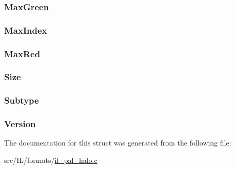 \hypertarget{struct_h_a_l_o_h_e_a_d_ad87d96087e9bc7638b73794455c70505}{
\subsubsection[{Max\-Green}]{ Max\-Green}}\label{struct_h_a_l_o_h_e_a_d_ad87d96087e9bc7638b73794455c70505}
\hypertarget{struct_h_a_l_o_h_e_a_d_a834ac3b22f70ee372f25adbbafdd832d}{
\subsubsection[{Max\-Index}]{ Max\-Index}}\label{struct_h_a_l_o_h_e_a_d_a834ac3b22f70ee372f25adbbafdd832d}
\hypertarget{struct_h_a_l_o_h_e_a_d_ab32f932f023853a698f9575d34670d58}{
\subsubsection[{Max\-Red}]{ Max\-Red}}\label{struct_h_a_l_o_h_e_a_d_ab32f932f023853a698f9575d34670d58}
\hypertarget{struct_h_a_l_o_h_e_a_d_acc434efe9df69cd2e13c646dfc6ff8a7}{
\subsubsection[{Size}]{ Size}}\label{struct_h_a_l_o_h_e_a_d_acc434efe9df69cd2e13c646dfc6ff8a7}
\hypertarget{struct_h_a_l_o_h_e_a_d_a7983926f0a17799db294a16bffeb3104}{
\subsubsection[{Subtype}]{ Subtype}}\label{struct_h_a_l_o_h_e_a_d_a7983926f0a17799db294a16bffeb3104}
\hypertarget{struct_h_a_l_o_h_e_a_d_a87b0716bec0fb12be5f5883eb71fcf01}{
\subsubsection[{Version}]{ Version}}\label{struct_h_a_l_o_h_e_a_d_a87b0716bec0fb12be5f5883eb71fcf01}


The documentation for this struct was generated from the following file\-:\begin{DoxyCompactItemize}
\item 
src/\-I\-L/formats/\hyperlink{il__pal__halo_8c}{il\-\_\-pal\-\_\-halo.\-c}\end{DoxyCompactItemize}
